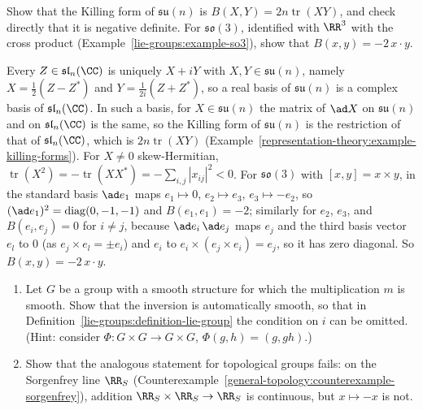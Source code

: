 \begin{exercise}\label{lie-groups:exercise-killing-su-n}
Show that the Killing form of $\mathfrak{su}(n)$ is $B(X, Y) = 2n\operatorname{tr}(XY)$, and check directly that it is negative definite. For $\mathfrak{so}(3)$, identified with $\RR^3$ with the
cross product (Example~\ref{lie-groups:example-so3}), show that $B(x, y) = -2\,x \cdot y$.
\end{exercise}

\begin{solution}
Every $Z \in \mathfrak{sl}_n(\CC)$ is uniquely $X + iY$ with $X, Y \in \mathfrak{su}(n)$, namely $X = \frac12(Z - Z^*)$ and $Y = \frac1{2i}(Z + Z^*)$, so a real basis of $\mathfrak{su}(n)$ is a
complex basis of $\mathfrak{sl}_n(\CC)$. In such a basis, for $X \in \mathfrak{su}(n)$ the matrix of $\ad X$ on $\mathfrak{su}(n)$ and on $\mathfrak{sl}_n(\CC)$ is the same, so the Killing form of
$\mathfrak{su}(n)$ is the restriction of that of $\mathfrak{sl}_n(\CC)$, which is $2n\operatorname{tr}(XY)$ (Example~\ref{representation-theory:example-killing-forms}). For
$X \neq 0$ skew-Hermitian, $\operatorname{tr}(X^2) = -\operatorname{tr}(XX^*) = -\sum_{i,j}|x_{ij}|^2 < 0$. For $\mathfrak{so}(3)$ with $[x, y] = x \times y$, in the standard basis
$\ad e_1$ maps $e_1 \mapsto 0$, $e_2 \mapsto e_3$, $e_3 \mapsto -e_2$, so $(\ad e_1)^2 = \operatorname{diag}(0, -1, -1)$ and $B(e_1, e_1) = -2$; similarly for $e_2$, $e_3$, and
$B(e_i, e_j) = 0$ for $i \neq j$, because $\ad e_i\,\ad e_j$ maps $e_j$ and the third basis vector $e_l$ to $0$ (as $e_j \times e_l = \pm e_i$) and $e_i$ to
$e_i \times (e_j \times e_i) = e_j$, so it has zero diagonal. So $B(x, y) = -2\,x \cdot y$.
\end{solution}

\begin{exercise}\label{lie-groups:exercise-inversion-automatic}
\begin{enumerate}
\item Let $G$ be a group with a smooth structure for which the multiplication $m$ is smooth. Show that the inversion is automatically smooth, so that in
Definition~\ref{lie-groups:definition-lie-group} the condition on $i$ can be omitted. (Hint: consider $\Phi \colon G \times G \to G \times G$, $\Phi(g, h) = (g, gh)$.)
\item Show that the analogous statement for topological groups fails: on the Sorgenfrey line $\RR_S$ (Counterexample~\ref{general-topology:counterexample-sorgenfrey}), addition
$\RR_S \times \RR_S \to \RR_S$ is continuous, but $x \mapsto -x$ is not.
\end{enumerate}
\end{exercise}

